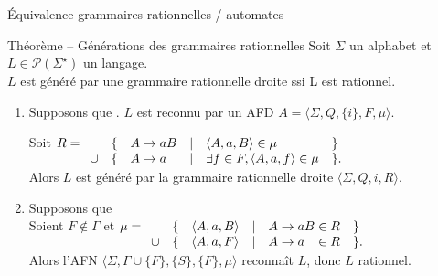 
\begingroup

\begin{frame}{Équivalence grammaires rationnelles / automates}
  
  \begin{block}{Théorème -- Générations des grammaires rationnelles}
    Soit $\Sigma$ un alphabet et $L \in \mathscr{P}(\Sigma^\star)$ un langage. \\
    $L$ est généré par une grammaire rationnelle droite ssi L est rationnel. 
  \end{block}
  
  
  \begin{enumerate}
  \item<2-> Supposons que . $L$ est reconnu par un AFD $A = \langle \Sigma, Q, \{i\}, F, \mu \rangle$. 
 
    Soit $R = \begin{array}[t]{rclcll}
      & \{ & A \rightarrow aB &|& \langle A, a, B\rangle \in \mu & \}\\
      \cup & \{ & A \rightarrow a\phantom{B} &|& \exists f\in F, \langle A, a, f\rangle \in \mu & \}.
    \end{array}$\\
    Alors \alert{$L$ est généré par la grammaire rationnelle droite $\langle \Sigma, Q, i, R \rangle$.}
  \item<3-> Supposons que \\
    Soient $F \notin \Gamma$ et $\mu = \begin{array}[t]{rclcll}
      & \{ & \langle A, a, B\rangle &|& A \rightarrow aB \in R &\}\\
      \cup & \{ & \langle A, a, F\rangle &|& A \rightarrow a\phantom{B} \in R &\}.
    \end{array}$\\
    Alors l'AFN $\langle \Sigma, \Gamma \cup \{F\}, \{S\}, \{F\}, \mu \rangle$ reconnaît $L$, donc \alert{$L$ rationnel}.
  \end{enumerate}

  
 
 

\end{frame}
